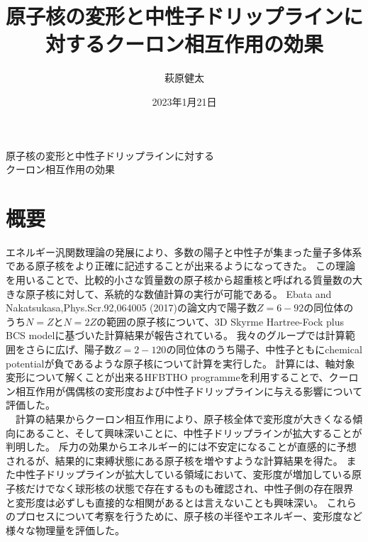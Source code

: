 \documentclass[10pt]{jarticle}
\title{原子核の変形と中性子ドリップラインに対するクーロン相互作用の効果}
\author{萩原健太}
\date{2023年1月21日}
\begin{document}
\begin{center}
  {\Large
    原子核の変形と中性子ドリップラインに対する\\
    クーロン相互作用の効果
  }
\end{center}


\section*{概要}
エネルギー汎関数理論の発展により、多数の陽子と中性子が集まった量子多体系である原子核をより正確に記述することが出来るようになってきた。
この理論を用いることで、比較的小さな質量数の原子核から超重核と呼ばれる質量数の大きな原子核に対して、系統的な数値計算の実行が可能である。
Ebata and Nakatsukasa,Phys.Scr.92,064005 (2017)の論文内で陽子数$Z=6-92$の同位体のうち$N=Z$と$N=2Z$の範囲の原子核について、3D Skyrme Hartree-Fock  plus BCS modelに基づいた計算結果が報告されている。
我々のグループでは計算範囲をさらに広げ、陽子数$Z=2-120$の同位体のうち陽子、中性子ともにchemical potentialが負であるような原子核について計算を実行した。
計算には、軸対象変形について解くことが出来るHFBTHO programmeを利用することで、クーロン相互作用が偶偶核の変形度および中性子ドリップラインに与える影響について評価した。\\
　計算の結果からクーロン相互作用により、原子核全体で変形度が大きくなる傾向にあること、そして興味深いことに、中性子ドリップラインが拡大することが判明した。
斥力の効果からエネルギー的には不安定になることが直感的に予想されるが、結果的に束縛状態にある原子核を増やすような計算結果を得た。
また中性子ドリップラインが拡大している領域において、変形度が増加している原子核だけでなく球形核の状態で存在するものも確認され、中性子側の存在限界と変形度は必ずしも直接的な相関があるとは言えないことも興味深い。
これらのプロセスについて考察を行うために、原子核の半径やエネルギー、変形度など様々な物理量を評価した。\\
\end{document}
